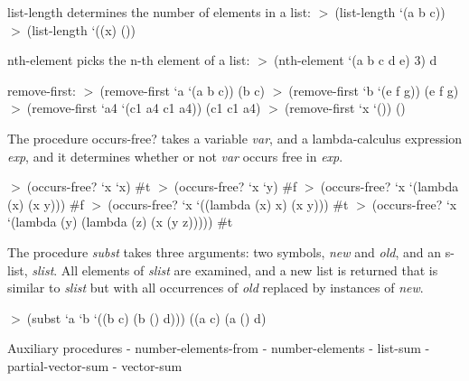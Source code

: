 \documentclass{article}
\newcommand{\prompt}{$> \ $}
\begin{document}
\begin{huge}

list-length determines the number of elements in a list: \al
\prompt (list-length `(a b c))\al
\prompt (list-length `((x) ())

nth-element picks the n-th element of a list:\al
\prompt (nth-element `(a b c d e) 3)\al
d


remove-first:\al
\prompt (remove-first `a `(a b c))\al
(b c)\al
\prompt (remove-first `b `(e f g))\al
(e f g)\al
\prompt (remove-first `a4 `(c1 a4 c1 a4))\al
(c1 c1 a4)\al
\prompt (remove-first `x `())\al
()


The procedure occurs-free? takes a variable {\it var}, and a lambda-calculus expression {\it exp}, and it determines whether or not {\it var} occurs free in {\it exp}. 

\prompt (occurs-free? `x `x) \al
\#t \al
\prompt (occurs-free? `x `y) \al
\#f \al
\prompt (occurs-free? `x `(lambda (x) (x y))) \al
\#f \al
\prompt (occurs-free? `x `((lambda (x) x) (x y))) \al
\#t \al
\prompt (occurs-free? `x `(lambda (y) (lambda (z) (x (y z))))) \al
\#t


The procedure {\it subst} takes three arguments: two symbols, {\it new} and {\it old}, and an s-list, {\it slist}. All elements of {\it slist} are examined, and a new list is returned that is similar to {\it slist} but with all occurrences of {\it old} replaced by instances of {\it new}.

\prompt (subst `a `b `((b c) (b () d))) \al
((a c) (a () d)



Auxiliary procedures\al
- number-elements-from\al
- number-elements\al
- list-sum\al
- partial-vector-sum\al
- vector-sum

\end{huge} 
\end{document}
